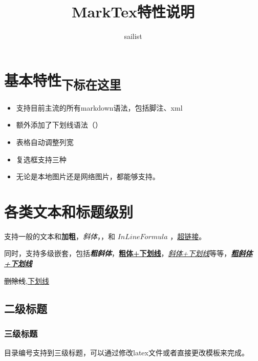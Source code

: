 \documentclass{article}%
\title{MarkTex特性说明}%
\author{sailist}%
\begin{document}
%
\normalsize%
\maketitle%
%
\tableofcontents
\newpage%

%
%
%

%
%
%
\section{基本特性\textsubscript{下标在这里}}%

%

%

%
\begin{itemize}%
\item%
支持目前主流的所有markdown语法，包括脚注、xml%
\item%
额外添加了下划线语法（）%
\item%
表格自动调整列宽%
\item%
复选框支持三种%
\item%
无论是本地图片还是网络图片，都能够支持。%
\end{itemize}%

%
%

%

%
\section{各类文本和标题级别}%

%
支持一般的文本和\textbf{加粗}，\textit{斜体}，，和 $InLine Formula$ ，\href{http://github.com/sailist/MarkTex2}{超链接}。%

%
同时，支持多级嵌套，包括\textbf{\textit{粗斜体}}，\textbf{\underline{粗体+下划线}}，\textit{\underline{斜体+下划线}}等等，\textbf{\textit{\underline{粗斜体+下划线}}}%

%
\sout{删除线},\underline{下划线}%

%
\subsection{二级标题}%

%

%
\subsubsection{三级标题}%

%
目录编号支持到三级标题，可以通过修改latex文件或者直接更改模板来完成。%
\end{document}
